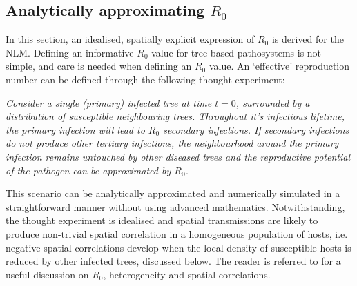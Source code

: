 \subsection{Analytically approximating $R_0$}

In this section, an idealised, spatially explicit expression of $R_0$ is derived for the NLM.
Defining an informative $R_0$-value for tree-based pathosystems is not simple, and care is needed when defining an $R_0$ value. 
An `effective' reproduction number can be defined through the following thought experiment: 

\textit{Consider a single (primary) infected tree at time $t=0$, surrounded by a distribution of susceptible neighbouring trees. Throughout it's infectious lifetime, the primary infection will lead to $R_0$ secondary infections. If secondary infections do not produce other tertiary infections, the neighbourhood around the primary infection remains untouched by other diseased trees and the reproductive potential of the pathogen can be approximated by $R_0$. }

This scenario can be analytically approximated and numerically simulated in a straightforward manner without using advanced mathematics.
Notwithstanding, the thought experiment is idealised and spatial transmissions are likely to produce non-trivial spatial correlation in a homogeneous population of hosts\textemdash, i.e. negative spatial correlations develop when the local density of susceptible hosts is reduced by other infected trees, discussed below.
The reader is referred to \cite{R0-perc-ref} for a useful discussion on $R_0$, heterogeneity and spatial correlations.

